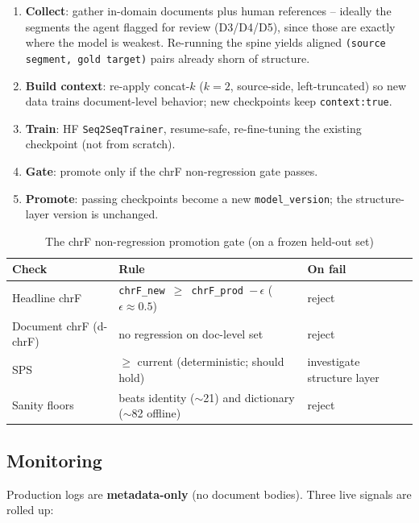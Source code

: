 \documentclass[12pt,a4paper]{article}
\begin{document}
\begin{enumerate}\setlength\itemsep{0.15em}
  \item \textbf{Collect}: gather in-domain documents plus human references -- ideally the segments the agent flagged for review (D3/D4/D5), since those are exactly where the model is weakest. Re-running the spine yields aligned \texttt{(source segment, gold target)} pairs already shorn of structure.
  \item \textbf{Build context}: re-apply concat-$k$ ($k=2$, source-side, left-truncated) so new data trains document-level behavior; new checkpoints keep \texttt{context:true}.
  \item \textbf{Train}: HF \texttt{Seq2SeqTrainer}, resume-safe, re-fine-tuning the existing checkpoint (not from scratch).
  \item \textbf{Gate}: promote only if the chrF non-regression gate passes.
  \item \textbf{Promote}: passing checkpoints become a new \texttt{model\_version}; the structure-layer version is unchanged.
\end{enumerate}

\begin{table}[H]
\centering
\caption{The chrF non-regression promotion gate (on a frozen held-out set)}
\small
\begin{tabularx}{\linewidth}{@{} l L l @{}}
\toprule
\textbf{Check} & \textbf{Rule} & \textbf{On fail} \\
\midrule
Headline chrF & \texttt{chrF\_new $\geq$ chrF\_prod $-\,\epsilon$} ($\epsilon\approx0.5$) & reject \\
Document chrF (d-chrF) & no regression on doc-level set & reject \\
SPS & $\geq$ current (deterministic; should hold) & investigate structure layer \\
Sanity floors & beats identity ($\sim$21) and dictionary ($\sim$82 offline) & reject \\
\bottomrule
\end{tabularx}
\end{table}

\subsection{Monitoring}

Production logs are \textbf{metadata-only} (no document bodies). Three live signals are rolled up:
\end{document}

